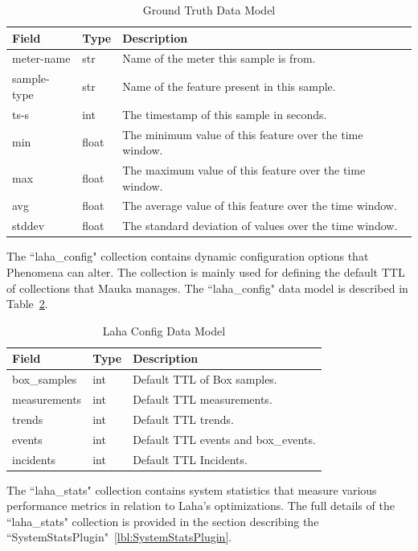 \begin{table}[H]
	\centering
	\caption{Ground Truth Data Model}
	\begin{tabularx}{\textwidth}{llX}
		\toprule
		\textbf{Field} & \textbf{Type} & \textbf{Description} \\
		\midrule
		meter-name & str & Name of the meter this sample is from. \\
		sample-type & str & Name of the feature present in this sample. \\
		ts-s & int & The timestamp of this sample in seconds. \\
		min & float & The minimum value of this feature over the time window. \\
		max & float & The maximum value of this feature over the time window. \\
		avg & float & The average value of this feature over the time window. \\
		stddev & float & The standard deviation of values over the time window. \\
		\bottomrule
	\end{tabularx}
	\label{table:ground_truth}
\end{table}

The ``laha\_config" collection contains dynamic configuration options that Phenomena can alter. The collection is mainly used for defining the default TTL of collections that Mauka manages. The ``laha\_config" data model is described in Table~\ref{table:laha_config}.

\begin{table}[H]
	\centering
	\caption{Laha Config Data Model}
	\begin{tabularx}{\textwidth}{llX}
		\toprule
		\textbf{Field} & \textbf{Type} & \textbf{Description} \\
		\midrule
		box\_samples & int & Default TTL of Box samples. \\
		measurements & int & Default TTL measurements. \\
		trends & int & Default TTL trends. \\
		events & int & Default TTL events and box\_events. \\
		incidents & int & Default TTL Incidents. \\
		\bottomrule
	\end{tabularx}
	\label{table:laha_config}
\end{table}

The ``laha\_stats" collection contains system statistics that measure various performance metrics in relation to Laha's optimizations. The full details of the ``laha\_stats" collection is provided in the section describing the ``SystemStatsPlugin"~\ref{lbl:SystemStatsPlugin}.

